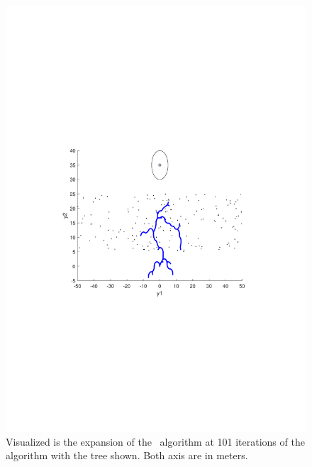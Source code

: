 \begin{figure}[!t]
    \centering
    \includegraphics[scale=.6, trim={4.5cm, 9cm, 5cm, 7cm}, clip]{figures/experiments/rrtfunnel-101samples-dyn.pdf}
    \caption[The expansion of the \rrtfunnel algorithm at 1, and 101 iterations]{Visualized is the expansion of the \rrtfunnel~algorithm at 101 iterations of the algorithm with the tree shown. Both axis are in meters.}
    \label{fig:algorithm_with_tree}
\end{figure}


